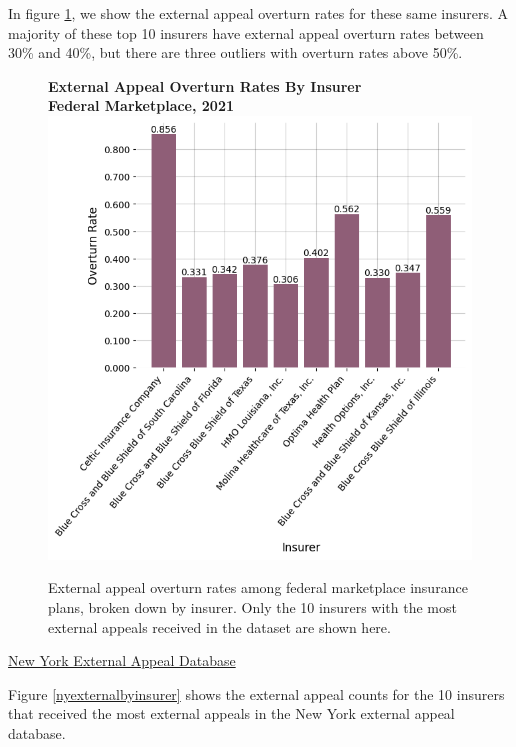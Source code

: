 \documentclass[12pt, a4paper,twoside,parskip=full]{report}
\theoremstyle{plain} %
\theoremstyle{definition} %
\theoremstyle{remark} %
\numberwithin{equation}{chapter}
\begin{document}
			\clearpage
	
		In figure \ref{federalexternaloverturnsbyinsurer}, we show the external appeal overturn rates for these same insurers. A majority of these top 10 insurers have external appeal overturn rates between 30\% and 40\%, but there are three outliers with overturn rates above 50\%.
		
		
		\begin{figure}[h!]
			\centering
			\textbf{External Appeal Overturn Rates By Insurer}\\
			\textbf{Federal Marketplace, 2021}\\
			\includegraphics[width=.8\textwidth]{images/cms_puf/overturn_rates_by_insurer.png}
			\caption{External appeal overturn rates among federal marketplace insurance plans, broken down by insurer. Only the 10 insurers with the most external appeals received in the dataset are shown here.}
			\label{federalexternaloverturnsbyinsurer}
		\end{figure}
	
		\clearpage
	
	
		\underline{New York External Appeal Database}

		Figure \ref{nyexternalbyinsurer} shows the external appeal counts for the 10 insurers that received the most external appeals in the New York external appeal database.
		
\end{document}
